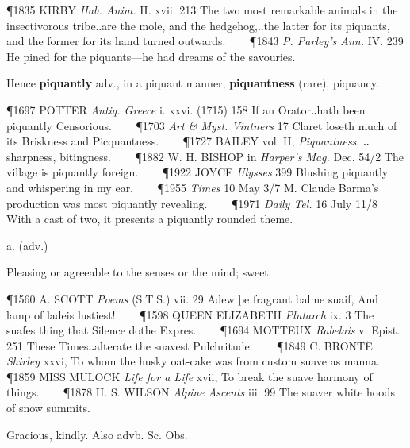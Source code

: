 \begin{description}[wide, labelwidth=!, labelindent=0pt]
\begin{myenumerate}
\P 1835 KIRBY  \textit{Hab. Anim.} II. xvii. 213 The two most remarkable animals in the insectivorous tribe‥are the mole, and the hedgehog,‥the latter for its piquants, and the former for its hand turned outwards.    
\P 1843 \textit{P. Parley's  Ann.} IV. 239 He pined for the piquants—he had dreams of the savouries.

\noindent Hence \textbf{piquantly} adv., in a piquant manner; \textbf{piquantness} (rare), piquancy.

\P 1697 POTTER  \textit{Antiq. Greece} i. xxvi. (1715) 158 If an Orator‥hath been piquantly Censorious.    
\P 1703 \textit{Art \& Myst.  Vintners} 17 Claret loseth much of its Briskness and Picquantness.    
\P 1727 BAILEY  vol. II, \textit{Piquantness}, ‥ sharpness, bitingness.    
\P 1882 W. H. BISHOP in \textit{Harper's Mag.} Dec. 54/2 The village is piquantly foreign.    
\P 1922 JOYCE  \textit{Ulysses} 399 Blushing piquantly and whispering in my ear.    
\P 1955  \textit{Times} 10 May 3/7 M. Claude Barma's production was most piquantly revealing.    
\P 1971  \textit{Daily Tel.} 16 July 11/8 With a cast of two, it presents a piquantly rounded theme.
\end{myenumerate}


 a. (adv.)

\noindent {}

\vspace{-0.3cm}

\begin{myenumerate}

 Pleasing or agreeable to the senses or the mind; sweet.

\P 1560 A. SCOTT  \textit{Poems} (S.T.S.) vii. 29 Adew þe fragrant balme suaif, And lamp of ladeis lustiest!    
\P 1598 QUEEN ELIZABETH  \textit{Plutarch} ix. 3 The suafes thing that Silence dothe Expres.    
\P 1694 MOTTEUX  \textit{Rabelais} v. Epist. 251 These Times‥alterate the suavest Pulchritude.    
\P 1849 C. BRONTË  \textit{Shirley} xxvi, To whom the husky oat-cake was from custom suave as manna.    
\P 1859 MISS MULOCK  \textit{Life for a Life} xvii, To break the suave harmony of things.    
\P 1878 H. S. WILSON  \textit{Alpine Ascents} iii. 99 The suaver white hoods of snow summits.

 Gracious, kindly. Also advb. Sc. Obs.


\end{myenumerate}
\end{description}
